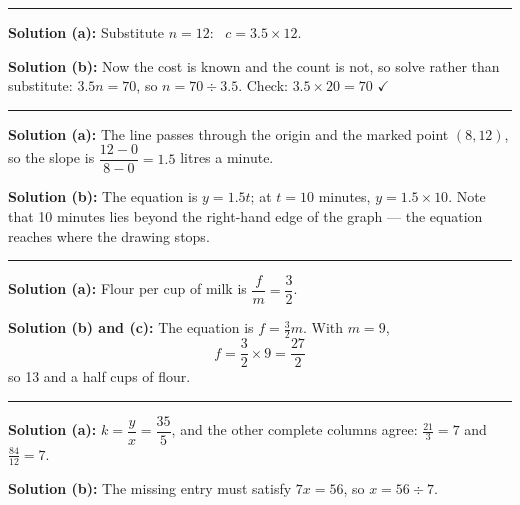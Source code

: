 \documentclass[12pt]{article}
\begin{document}
\vspace{0.2cm}\noindent\rule{\linewidth}{0.2pt}


\textbf{Solution (a):} Substitute $n = 12$: \ $c = 3.5 \times 12$.

\textbf{Solution (b):} Now the cost is known and the count is not, so solve rather
than substitute: $3.5n = 70$, so $n = 70 \div 3.5$.
Check: $3.5 \times 20 = 70$ $\checkmark$

\vspace{0.2cm}\noindent\rule{\linewidth}{0.2pt}


\textbf{Solution (a):} The line passes through the origin and the marked point
$(8, 12)$, so the slope is $\dfrac{12 - 0}{8 - 0} = 1.5$ litres a minute.

\textbf{Solution (b):} The equation is $y = 1.5t$; at $t = 10$ minutes,
$y = 1.5 \times 10$. Note that 10 minutes lies beyond the right-hand edge of the
graph --- the equation reaches where the drawing stops.

\vspace{0.2cm}\noindent\rule{\linewidth}{0.2pt}


\textbf{Solution (a):} Flour per cup of milk is $\dfrac{f}{m} = \dfrac{3}{2}$.

\textbf{Solution (b) and (c):} The equation is $f = \tfrac{3}{2}m$. With $m = 9$,
\[ f = \frac{3}{2}\times 9 = \frac{27}{2} \]
so 13 and a half cups of flour.

\vspace{0.2cm}\noindent\rule{\linewidth}{0.2pt}


\textbf{Solution (a):} $k = \dfrac{y}{x} = \dfrac{35}{5}$, and the other complete
columns agree: $\tfrac{21}{3} = 7$ and $\tfrac{84}{12} = 7$.

\textbf{Solution (b):} The missing entry must satisfy $7x = 56$, so
$x = 56 \div 7$.
\end{document}
